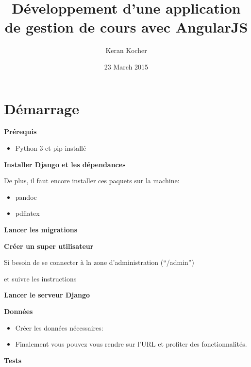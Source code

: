 \documentclass[letterpaper,10pt,oneside]{sphinxmanual}
\title{Développement d'une application de gestion de cours avec AngularJS}
\date{23 March 2015}
\author{Keran Kocher}
\begin{document}
\maketitle
\tableofcontents
{}\label{index::doc}



\chapter{Démarrage}
\label{start:developpement-d-une-application-de-gestions-de-cours-avec-angularjs}\label{start:demarrage}\label{start::doc}
\textbf{Prérequis}
\begin{itemize}
\item {} 
Python 3 et pip installé

\end{itemize}

\textbf{Installer Django et les dépendances}


De plus, il faut encore installer ces paquets sur la machine:
\begin{itemize}
\item {} 
pandoc

\item {} 
pdflatex

\end{itemize}

\textbf{Lancer les migrations}


\textbf{Créer un super utilisateur}

Si besoin de se connecter à la zone d'administration (``/admin'')

 et suivre les instructions

\textbf{Lancer le serveur Django}


\textbf{Données}
\begin{itemize}
\item {} 
Créer les données nécessaires: 

\item {} 
Finalement vous pouvez vous rendre sur l'URL  et profiter des fonctionnalités.

\end{itemize}

\textbf{Tests}
\end{document}
